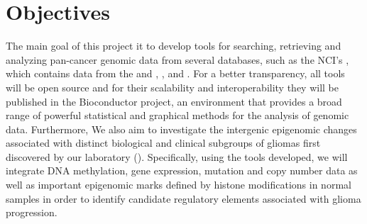 
\newcommand{\comando}[1]{\textbf{$\backslash$#1}}


\section{Objectives}

The main goal of this project it to develop tools for searching, retrieving and analyzing pan-cancer genomic data from several databases, such as the NCI's  , which contains data from the  and , , and .  For a better transparency, all tools will be open source and for their scalability and interoperability they will be published in the Bioconductor project, an environment that provides a broad range of powerful statistical and graphical methods for the analysis of genomic data.
Furthermore, We also aim to investigate the intergenic epigenomic changes associated with distinct biological and clinical subgroups of gliomas first discovered by our laboratory (\cite{ceccarelli2016molecular}). Specifically, using the tools developed, we will integrate DNA methylation, gene expression, mutation and copy number data as well as important epigenomic marks defined by histone modifications in normal samples in order to identify candidate regulatory elements associated with glioma progression.


